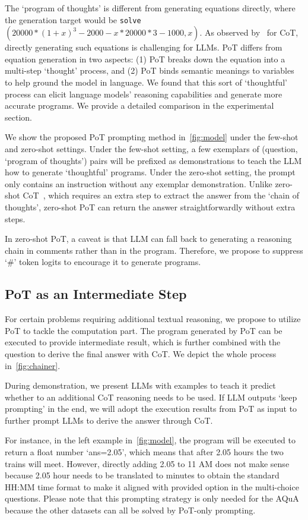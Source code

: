 The `program of thoughts' is different from generating equations directly, where the generation target would be \texttt{solve}$(20000 * (1 + x)^3 - 2000 - x * 20000 * 3 - 1000, x)$. As observed by~\cite{wei2022chain} for CoT, directly generating such equations is challenging for LLMs. PoT differs from equation generation in two aspects: (1) PoT breaks down the equation into a multi-step `thought' process, and (2) PoT binds semantic meanings to variables to help ground the model in language. We found that this sort of `thoughtful' process can elicit language models' reasoning capabilities and generate more accurate programs. We provide a detailed comparison in the experimental section. 

We show the proposed PoT prompting method in~\autoref{fig:model} under the few-shot and zero-shot settings. Under the few-shot setting, a few exemplars of (question, `program of thoughts') pairs will be prefixed as demonstrations to teach the LLM how to generate `thoughtful' programs. Under the zero-shot setting, the prompt only contains an instruction without any exemplar demonstration. Unlike zero-shot CoT~\citep{kojima2022large}, which requires an extra step to extract the answer from the `chain of thoughts', zero-shot PoT can return the answer straightforwardly without extra steps. 

In zero-shot PoT, a caveat is that LLM can fall back to generating a reasoning chain in comments rather than in the program. Therefore, we propose to suppress `\#' token logits to encourage it to generate programs.

\subsection{PoT as an Intermediate Step} For certain problems requiring additional textual reasoning, we propose to utilize PoT to tackle the computation part. The program generated by PoT can be executed to provide intermediate result, which is further combined with the question to derive the final answer with CoT. We depict the whole process in~\autoref{fig:chainer}. 

During demonstration, we present LLMs with examples to teach it predict whether to an additional CoT reasoning needs to be used. If LLM outputs `keep prompting' in the end, we will adopt the execution results from PoT as input to further prompt LLMs to derive the answer through CoT. 

For instance, in the left example in~\autoref{fig:model}, the program will be executed to return a float number `ans=2.05', which means that after 2.05 hours the two trains will meet. However, directly adding 2.05 to 11 AM does not make sense because 2.05 hour needs to be translated to minutes to obtain the standard HH:MM time format to make it aligned with provided option in the multi-choice questions. Please note that this prompting strategy is only needed for the AQuA because the other datasets can all be solved by PoT-only prompting.

